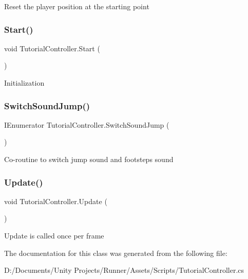 Reset the player position at the starting point \mbox{\label{class_tutorial_controller_a5ae5a0517d1a7c8a599146b0c3b2c9eb}} 
\subsubsection{\texorpdfstring{Start()}{Start()}}
{\footnotesize\ttfamily void Tutorial\+Controller.\+Start (\begin{DoxyParamCaption}{ }\end{DoxyParamCaption})\hspace{0.3cm}{\ttfamily [private]}}

Initialization \mbox{\label{class_tutorial_controller_a668bb94881d2e400dafcebad517a731e}} 
\subsubsection{\texorpdfstring{Switch\+Sound\+Jump()}{SwitchSoundJump()}}
{\footnotesize\ttfamily I\+Enumerator Tutorial\+Controller.\+Switch\+Sound\+Jump (\begin{DoxyParamCaption}{ }\end{DoxyParamCaption})\hspace{0.3cm}{\ttfamily [private]}}

Co-\/routine to switch jump sound and footsteps sound \mbox{\label{class_tutorial_controller_a10faf69182b1b2364b4a554b01ef63ab}} 
\subsubsection{\texorpdfstring{Update()}{Update()}}
{\footnotesize\ttfamily void Tutorial\+Controller.\+Update (\begin{DoxyParamCaption}{ }\end{DoxyParamCaption})\hspace{0.3cm}{\ttfamily [private]}}

Update is called once per frame 

The documentation for this class was generated from the following file\+:\begin{DoxyCompactItemize}
\item 
D\+:/\+Documents/\+Unity Projects/\+Runner/\+Assets/\+Scripts/Tutorial\+Controller.\+cs\end{DoxyCompactItemize}
